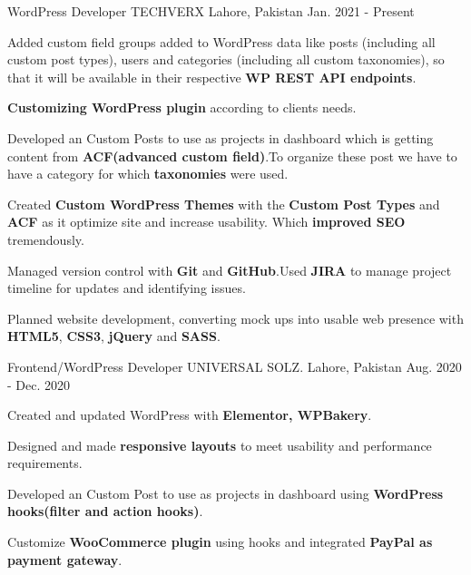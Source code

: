 

\begin{cventries}

  \cventry
    {WordPress Developer} %
    {TECHVERX} %
    {Lahore, Pakistan} %
    {Jan. 2021 - Present} %
    {
      \begin{cvitems} %
        \item {Added custom field groups added to WordPress data like posts (including all custom post types), users and categories (including all custom taxonomies), so that it will be available in their respective \textbf{WP REST API endpoints}.}
        \item {\textbf{Customizing WordPress plugin} according to clients needs.}
        \item {Developed an Custom Posts to use as projects in dashboard which is getting content from \textbf{ACF(advanced custom field)}.To organize these post we have to have a category for which \textbf{taxonomies} were used.}
        \item {Created \textbf{Custom WordPress Themes} with the \textbf{Custom Post Types} and \textbf{ACF} as it optimize site and increase usability. Which \textbf{improved SEO} tremendously.}
        \item {Managed version control with \textbf{Git} and \textbf{GitHub}.Used \textbf{JIRA} to manage project timeline for updates and identifying issues.}
        \item {Planned website development, converting mock ups into usable web presence with \textbf{HTML5}, \textbf{CSS3}, \textbf{jQuery} and \textbf{SASS}.}
      \end{cvitems}
    }

  \cventry
    {Frontend/WordPress Developer} %
    {UNIVERSAL SOLZ.} %
    {Lahore, Pakistan} %
    {Aug. 2020 - Dec. 2020} %
    {
      \begin{cvitems} %
        \item {Created and updated WordPress with \textbf{Elementor, WPBakery}.}
        \item {Designed and made \textbf{responsive layouts} to meet usability and performance requirements.}
        \item {Developed an Custom Post to use as projects in dashboard using \textbf{WordPress hooks(filter and action hooks)}.}
        \item {Customize \textbf{WooCommerce plugin} using hooks and integrated \textbf{PayPal as payment gateway}.}
      \end{cvitems}
    }


\end{cventries}
